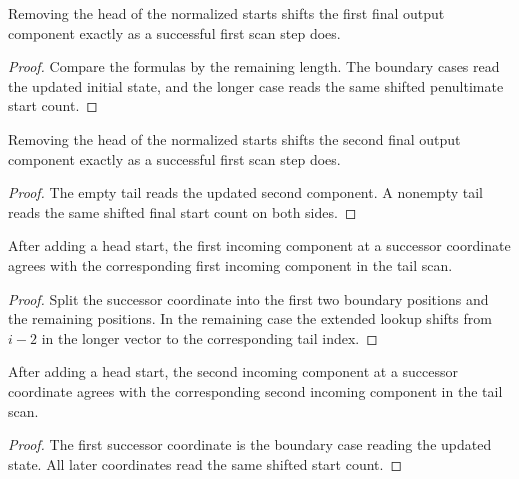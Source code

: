 \begin{lemma}

  \label{lem:scan_out1_tail}
  Removing the head of the normalized starts shifts the first final output
  component exactly as a successful first scan step does.
\end{lemma}
\begin{proof}

\leanok
  Compare the formulas by the remaining length.  The boundary cases read
  the updated initial state, and the longer case reads the same shifted
  penultimate start count.
\end{proof}

\begin{lemma}

  \label{lem:scan_out2_tail}
  Removing the head of the normalized starts shifts the second final
  output component exactly as a successful first scan step does.
\end{lemma}
\begin{proof}

\leanok
  The empty tail reads the updated second component.  A nonempty tail reads
  the same shifted final start count on both sides.
\end{proof}

\begin{lemma}

  \label{lem:scan_prev2_cons_succ}
  After adding a head start, the first incoming component at a successor
  coordinate agrees with the corresponding first incoming component in the
  tail scan.
\end{lemma}
\begin{proof}

\leanok
  Split the successor coordinate into the first two boundary positions and
  the remaining positions.  In the remaining case the extended lookup
  shifts from \(i-2\) in the longer vector to the corresponding tail
  index.
\end{proof}

\begin{lemma}

  \label{lem:scan_prev1_cons_succ}
  After adding a head start, the second incoming component at a successor
  coordinate agrees with the corresponding second incoming component in
  the tail scan.
\end{lemma}
\begin{proof}

\leanok
  The first successor coordinate is the boundary case reading the updated
  state.  All later coordinates read the same shifted start count.
\end{proof}

